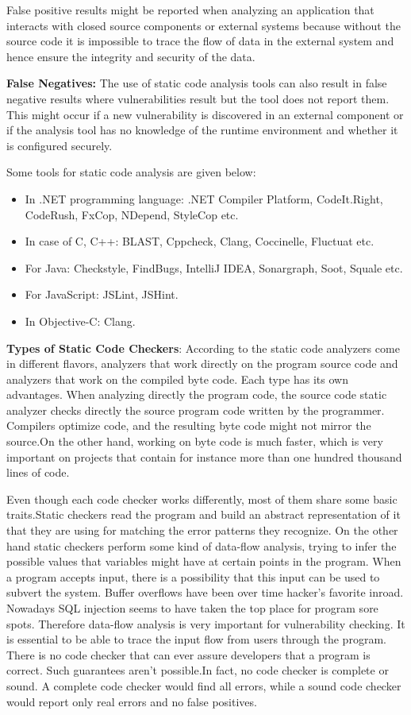 False positive results might be reported when analyzing an application that interacts with closed source components or external systems because without the source code it is impossible to trace the flow of data in the external system and hence ensure the integrity and security of the data.

\textbf{False Negatives:}
The use of static code analysis tools can also result in false negative results where vulnerabilities result but the tool does not report them. This might occur if a new vulnerability is discovered in an external component or if the analysis tool has no knowledge of the runtime environment and whether it is configured securely.

Some tools for static code analysis are given below:
\begin{itemize}
	\item In .NET programming language: .NET Compiler Platform, CodeIt.Right, CodeRush, FxCop, NDepend, StyleCop etc.
	\item In case of C, C++: BLAST, Cppcheck, Clang, Coccinelle, Fluctuat etc.  
	\item For Java: Checkstyle, FindBugs, IntelliJ IDEA, Sonargraph, Soot, Squale etc.
	\item For JavaScript: JSLint, JSHint. 
	\item In Objective-C: Clang.
\end{itemize}

\textbf{Types of Static Code Checkers}: According to the \cite{ref_91_bardas2010static}  static code analyzers come in different flavors, analyzers that work directly on the
program source code and analyzers that work on the compiled byte code. Each type has its own advantages. When analyzing directly the program code, the source code static analyzer checks directly the source program code written by the programmer. Compilers optimize code, and the resulting byte code might not mirror the source.On the other hand, working on byte code is much faster, which is very important on
projects that contain for instance more than one hundred thousand lines of code.

Even though each code checker works differently, most of them share some basic traits.Static checkers read the program and build an abstract representation of it that they are using for matching the error patterns they recognize. On the other hand static checkers
perform some kind of data-flow analysis, trying to infer the possible values that variables might have at certain points in the program. When a program accepts input, there is a possibility that this input can be used to subvert the system. Buffer overflows have been over time hacker's favorite inroad. Nowadays SQL injection seems to have taken the top
place for program sore spots. Therefore data-flow analysis is very important for vulnerability checking. It is essential to be able to trace the input flow from users through the program. There is no code checker that can ever assure developers that a program is correct. Such guarantees aren't possible.In fact, no code checker is complete or sound. A complete code checker would find all errors, while a sound code checker would report only real errors and no false positives.

